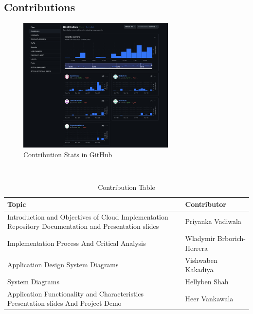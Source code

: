 \documentclass{llncs}
\begin{document}
\subsection{Contributions}
\begin{figure}[htbp]
    \centering
    \includegraphics[width=0.7\textwidth]{../images/contributions.png}
    \vspace{0.01\textwidth}
    \caption{Contribution Stats in GitHub}
    \label{fig:contributions}
\end{figure}

\vphantom{}\\

\begin{table}[htbp]

    \begin{tabular}{|p{}|p{}|}
        \hline
        \textbf{Topic}    & \textbf{Contributor}      \\
        \hline
        Introduction and Objectives of Cloud Implementation  \newline
        Repository Documentation and Presentation slides & Priyanka Vadiwala         \\
        \hline
        Implementation Process  And Critical Analysis
                       & Wladymir Brborich-Herrera \\
        \hline
        Application Design    \newline          
        System Diagrams & Vishwaben Kakadiya        \\
        \hline
        System Diagrams        & Hellyben Shah             \\
        \hline
        Application Functionality and Characteristics  \newline
        Presentation slides And Project Demo     & Heer Vankawala            \\
        \hline
    \end{tabular}
    \caption{Contribution Table}
    \label{tab:contribution}
\end{table}
\end{document}
